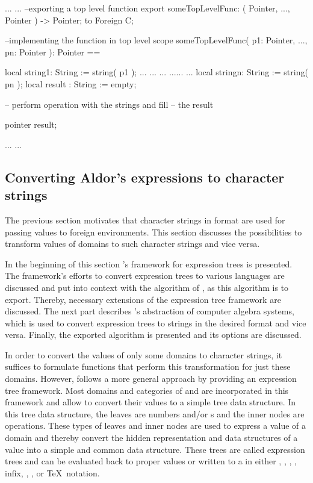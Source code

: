 \begin{adsnippet}
...
...
--exporting a top level function
export {
  someTopLevelFunc: ( Pointer, ..., Pointer ) -> Pointer;
} to Foreign C;


--implementing the function in top level scope
someTopLevelFunc( p1: Pointer, ..., pn: Pointer ): Pointer == {
  local string1: String := string( p1 );
  ...   ...      ...    ......     ... 
  local stringn: String := string( pn );
  local result : String := empty;

  -- perform operation with the strings and fill
  -- the result
  
  pointer result;
}
...
...
\end{adsnippet}
 



\subsection{Converting Aldor's expressions to character strings}

The previous section motivates that character strings in \C format are used for passing values to foreign environments. This section discusses the possibilities to transform values of \Aldor domains to such character strings and vice versa. 

In the beginning of this section \LibAlgebra's framework for expression trees is presented. The framework's efforts to convert expression trees to various languages are discussed and put into context with the  algorithm of , as this algorithm is to export. Thereby, necessary extensions of the expression tree framework are discussed. The next part describes \LibExtIO's abstraction of computer algebra systems, which is used to convert expression trees to strings in the desired format and vice versa. Finally, the exported algorithm is presented and its options are discussed.

In order to convert the values of only some \Aldor domains to character strings, it suffices to formulate functions that perform this transformation for just these domains. However, \LibAlgebra follows a more general approach by providing an expression tree framework. Most domains and categories of \LibAldor and \LibAlgebra are incorporated in this framework and allow to convert their values to a simple tree data structure. In this tree data structure, the leaves are numbers and/or s and the inner nodes are operations. These types of leaves and inner nodes are used to express a value of a domain and thereby convert the hidden representation and data structures of a value into a simple and common data structure. These trees are called expression trees and can be evaluated back to proper values or written to a  in either \Aldor, \Axiom, \C, \Fortran, infix, \Lisp, \Maple, or \TeX~notation. 

